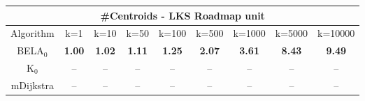 \begin{tabular}{c|cccccccc}\toprule
\multicolumn{9}{c}{#Centroids - LKS Roadmap unit}\\ \midrule
Algorithm & k=1 & k=10 & k=50 & k=100 & k=500 & k=1000 & k=5000 & k=10000 \\ \midrule
BELA$_0$ & \textbf{1.00} & \textbf{1.02} & \textbf{1.11} & \textbf{1.25} & \textbf{2.07} & \textbf{3.61} & \textbf{8.43} & \textbf{9.49} \\
K$_0$ & -- & -- & -- & -- & -- & -- & -- & -- \\
mDijkstra & -- & -- & -- & -- & -- & -- & -- & -- \\ \bottomrule 
\end{tabular}
